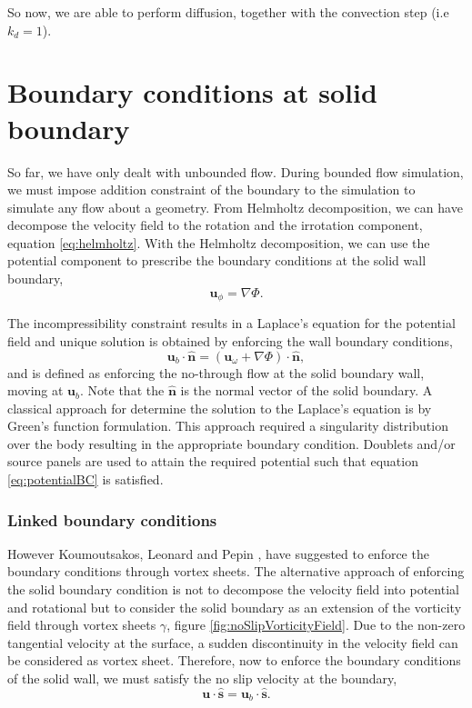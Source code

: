So now, we are able to perform diffusion, together with the convection step (i.e $k_d = 1$).

\section{Boundary conditions at solid boundary}
\label{sec:boundaryConditions}

So far, we have only dealt with unbounded flow. During bounded flow simulation, we must impose addition constraint of the boundary to the simulation to simulate any flow about a geometry. From Helmholtz decomposition, we can have decompose the velocity field to the rotation and the irrotation component, equation \ref{eq:helmholtz}. With the Helmholtz decomposition, we can use the potential component to prescribe the boundary conditions at the solid wall boundary,
	\begin{equation}
	\mathbf{u}_{\phi} = \nabla\Phi.
	\end{equation}

The incompressibility constraint results in a Laplace's equation for the potential field and unique solution is obtained by enforcing the wall boundary conditions,
	\begin{equation}
	\mathbf{u}_b\cdot\mathbf{\hat{n}} = \left(\mathbf{u}_{\omega} + \nabla\Phi\right) \cdot \mathbf{\hat{n}},
	\label{eq:potentialBC}
	\end{equation}
and is defined as enforcing the no-through flow at the solid boundary wall, moving at $\mathbf{u}_b$. Note that the $\mathbf{\hat{n}}$ is the normal vector of the solid boundary. A classical approach for determine the solution to the Laplace's equation is by Green's function formulation. This approach required a singularity distribution over the body resulting in the appropriate boundary condition. Doublets and/or source panels are used to attain the required potential such that equation \ref{eq:potentialBC} is satisfied.

\subsubsection{Linked boundary conditions}

However Koumoutsakos, Leonard and Pepin \cite{Koumoutsakos1994b}, have suggested to enforce the boundary conditions through vortex sheets. The alternative approach of enforcing the solid boundary condition is not to decompose the velocity field into potential and rotational but to consider the solid boundary as an extension of the vorticity field through vortex sheets $\gamma$, figure \ref{fig:noSlipVorticityField}. Due to the non-zero tangential velocity at the surface, a sudden discontinuity in the velocity field can be considered as vortex sheet. Therefore, now to enforce the boundary conditions of the solid wall, we must satisfy the no slip velocity at the boundary,
	\begin{equation}
	\mathbf{u}\cdot\mathbf{\hat{s}} = \mathbf{u}_b\cdot\mathbf{\hat{s}}.
	\end{equation}

